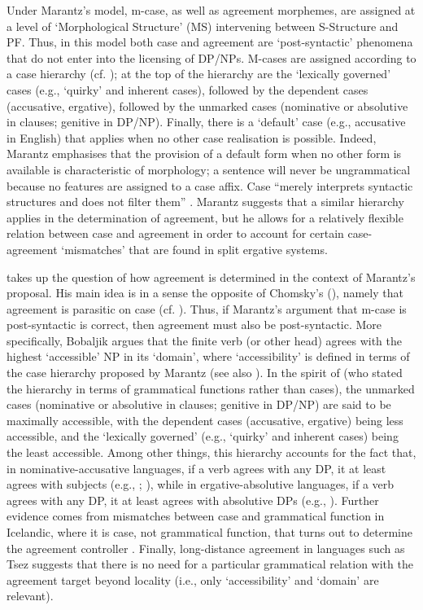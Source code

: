 \documentclass[output=paper]{langsci/langscibook}
\begin{document}
Under Marantz’s model, m-case, as well as agreement morphemes, are assigned at a level of ‘Morphological Structure’ (MS) intervening between S-Structure and PF. Thus, in this model both case and agreement are ‘post-syntactic’ phenomena that do not enter into the licensing of DP/NPs. M-cases are assigned according to a case hierarchy (cf. \citealt{Yip1987}); at the top of the hierarchy are the ‘lexically governed’ cases (e.g., ‘quirky’ and inherent cases), followed by the dependent cases (accusative, ergative), followed by the unmarked cases (nominative or absolutive in clauses; genitive in DP/NP). Finally, there is a ‘default’ case (e.g., accusative in English) that applies when no other case realisation is possible. Indeed, Marantz emphasises that the provision of a default form when no other form is available is characteristic of morphology; a sentence will never be ungrammatical because no features are assigned to a case affix. Case “merely interprets syntactic structures and does not filter them” \citep[24]{Marantz1991}. Marantz suggests that a similar hierarchy applies in the determination of agreement, but he allows for a relatively flexible relation between case and agreement in order to account for certain case-agreement ‘mismatches’ that are found in split ergative systems.

\citet{Bobaljik2008} takes up the question of how agreement is determined in the context of Marantz’s proposal. His main idea is in a sense the opposite of Chomsky’s (\citeyear{Chomsky2000, Chomsky2001}), namely that agreement is parasitic on case (cf. \citealt{Bittner1996}). Thus, if Marantz’s argument that m-case is post-syntactic is correct, then agreement must also be post-syntactic. More specifically, Bobaljik argues that the finite verb (or other head) agrees with the highest ‘accessible’ NP in its ‘domain’, where ‘accessibility’ is defined in terms of the case hierarchy proposed by Marantz (see also \citealt{McFadden2004}). In the spirit of \citet{Moravcsik1974} (who stated the hierarchy in terms of grammatical functions rather than cases), the unmarked cases (nominative or absolutive in clauses; genitive in DP/NP) are said to be maximally accessible, with the dependent cases (accusative, ergative) being less accessible, and the ‘lexically governed’ (e.g., ‘quirky’ and inherent cases) being the least accessible. Among other things, this hierarchy accounts for the fact that, in nominative-accusative languages, if a verb agrees with any DP, it at least agrees with subjects (e.g., \citealt{Moravcsik1974}; \citealt{Gilligan1987}), while in ergative-absolutive languages, if a verb agrees with any DP, it at least agrees with absolutive DPs (e.g., \citealt{Croft1990}). Further evidence comes from mismatches between case and grammatical function in Icelandic, where it is case, not grammatical function, that turns out to determine the agreement controller \citep{Sigurðsson1993}. Finally, long-distance agreement in languages such as Tsez \citep{Polinsky2001} suggests that there is no need for a particular grammatical relation with the agreement target beyond locality (i.e., only ‘accessibility’ and ‘domain’ are relevant).
\end{document}
